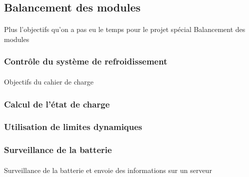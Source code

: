 		\subsection{Balancement des modules}
	
			\paragraph{}	
			Plus l'objectifs qu'on a pas eu le temps pour le projet spécial Balancement des modules
	
		\subsubsection{Contrôle du système de refroidissement}
		
			\paragraph{}	
			Objectifs du cahier de charge
	
		\subsubsection{Calcul de l’état de charge}

			\paragraph{}		
			
			
		\subsubsection{Utilisation de limites dynamiques}
			
			\paragraph{}	

		\subsubsection{Surveillance de la batterie}

			\paragraph{}
			Surveillance de la batterie et envoie des informations sur un serveur


	
		